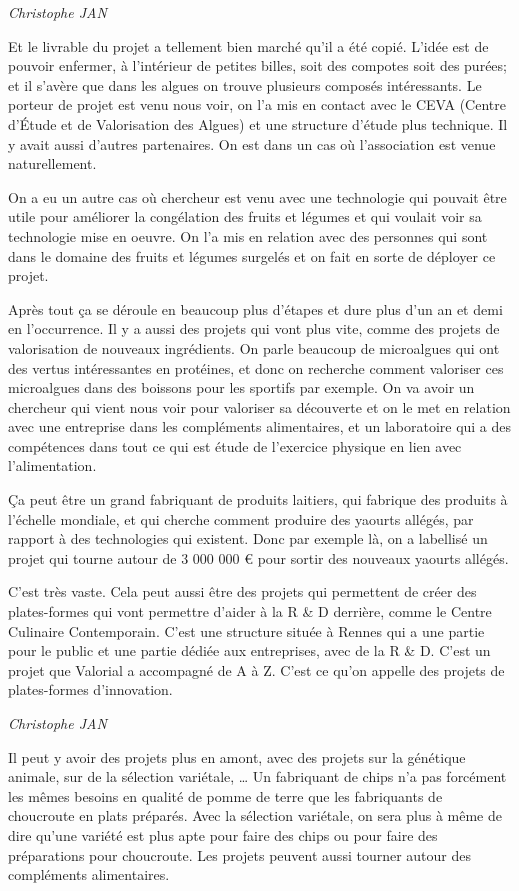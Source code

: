 \documentclass[a4paper,12pt]{report}
\begin{document}
	\emph{Christophe JAN}
	
    Et le livrable du projet a tellement bien marché qu’il a été copié. L’idée est de pouvoir enfermer, à l’intérieur de petites billes, soit des compotes soit des purées; et il s’avère que dans les algues on trouve plusieurs composés intéressants. Le porteur de projet est venu nous voir, on l’a mis en contact avec le CEVA (Centre d’Étude et de Valorisation des Algues) et une structure d’étude plus technique. Il y avait aussi d’autres partenaires. On est dans un cas où l’association est venue naturellement. 

	On a eu un autre cas où chercheur est venu avec une technologie qui pouvait être utile pour améliorer la congélation des fruits et légumes et qui voulait voir sa technologie mise en oeuvre. On l’a mis en relation avec des personnes qui sont dans le domaine des fruits et légumes surgelés et on fait en sorte de déployer ce projet.

	Après tout ça se déroule en beaucoup plus d’étapes et dure plus d’un an et demi en l’occurrence. Il y a aussi des projets qui vont plus vite, comme des projets de valorisation de nouveaux ingrédients. On parle beaucoup de microalgues qui ont des vertus intéressantes en protéines, et donc on recherche comment valoriser ces microalgues dans des boissons pour les sportifs par exemple. On va avoir un chercheur qui vient nous voir pour valoriser sa découverte et on le met en relation avec une entreprise dans les compléments alimentaires, et un laboratoire qui a des compétences dans tout ce qui est étude de l’exercice physique en lien avec l’alimentation.
	
	Ça peut être un grand fabriquant de produits laitiers, qui fabrique des produits à l’échelle mondiale, et qui cherche comment produire des yaourts allégés, par rapport à des technologies qui existent. Donc par exemple là, on a labellisé un projet qui tourne autour de 3 000 000 € pour sortir des nouveaux yaourts allégés.
	
	C’est très vaste. Cela peut aussi être des projets qui permettent de créer des plates-formes qui vont permettre d’aider à la R \& D derrière, comme le Centre Culinaire Contemporain. C’est une structure située à Rennes qui a une partie pour le public et une partie dédiée aux entreprises, avec de la R \& D. C’est un projet que Valorial a accompagné de A à Z. C’est ce qu’on appelle des projets de plates-formes d’innovation.

	\emph{Christophe JAN}
	
    Il peut y avoir des projets plus en amont, avec des projets sur la génétique animale, sur de la sélection variétale, … Un fabriquant de chips n’a pas forcément les mêmes besoins en qualité de pomme de terre que les fabriquants de choucroute en plats préparés. Avec la sélection variétale, on sera plus à même de dire qu’une variété est plus apte pour faire des chips ou pour faire des préparations pour choucroute. Les projets peuvent aussi tourner autour des compléments alimentaires.
\end{document}
